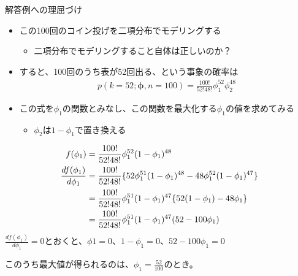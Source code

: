 \documentclass[aspectratio=169,unicode,dvipdfmx,14pt]{beamer}
\begin{document}
\begin{frame}{解答例への理屈づけ}
\begin{itemize}
\item この100回のコイン投げを二項分布でモデリングする
\begin{itemize}
\item 二項分布でモデリングすること自体は正しいのか？
\end{itemize}
\item すると、100回のうち表が52回出る、という事象の確率は
\begin{align}
p(k=52;\bm{\phi},n=100)=\frac{100!}{52!48!}\phi_1^{52}\phi_2^{48}
\end{align}
\item この式を$\phi_1$の関数とみなし、この関数を最大化する$\phi_1$の値を求めてみる
\begin{itemize}
\item $\phi_2$は$1 - \phi_1$で置き換える
\end{itemize}
\end{itemize}
\end{frame}

\begin{frame}
\begin{align}
f(\phi_1) & = \frac{100!}{52!48!}\phi_1^{52}(1-\phi_1)^{48}
\\
\frac{d f(\phi_1)}{d \phi_1} & = 
\frac{100!}{52!48!} 
\{ 52 \phi_1^{51} (1 - \phi_1)^{48} - 48 \phi_1^{52} (1 - \phi_1)^{47} \}
\notag \\ & =
\frac{100!}{52!48!} \phi_1^{51} (1 - \phi_1)^{47} \{ 52 (1 - \phi_1) - 48 \phi_1 \}
\notag \\ & =
\frac{100!}{52!48!} \phi_1^{51} (1 - \phi_1)^{47} ( 52 - 100 \phi_1 )
\label{eq:ML_derivative}
\end{align}
$\frac{d f(\phi_1)}{d \phi_1} = 0$とおくと、$\phi1=0$、$1-\phi_1=0$、$52 - 100 \phi_1 = 0$

このうち最大値が得られるのは、$\phi_1 = \frac{52}{100}$のとき。
\end{frame}
\end{document}
